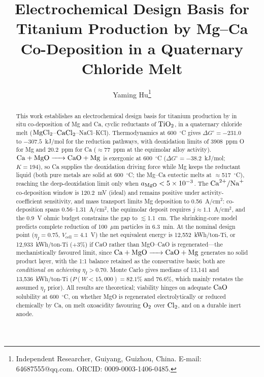 \documentclass[11pt]{article}
\begin{document}
\linenumbers
\doublespacing

\title{Electrochemical Design Basis for Titanium Production by Mg--Ca Co-Deposition in a Quaternary Chloride Melt}

\author{Yaming Hu\thanks{Independent Researcher, Guiyang, Guizhou, China. E-mail: 64687555@qq.com. ORCID: 0009-0003-1406-0485.}}

\date{}

\maketitle

\begin{abstract}
This work establishes an electrochemical design basis for titanium production by in situ co-deposition of Mg and Ca, cyclic reductants of $\ce{TiO2}$, in a quaternary chloride melt ($\ce{MgCl2}$--$\ce{CaCl2}$--NaCl--KCl). Thermodynamics at 600~$^{\circ}$C gives $\Delta G^{\circ} = -231.0$ to $-307.5$~kJ/mol for the reduction pathways, with deoxidation limits of 3908~ppm O for Mg and 20.2~ppm for Ca ($\approx$77~ppm at the equimolar alloy activity). $\ce{Ca + MgO -> CaO + Mg}$ is exergonic at 600~$^{\circ}$C ($\Delta G^{\circ} = -38.2$~kJ/mol; $K = 194$), so Ca supplies the deoxidation driving force while Mg keeps the reductant liquid (both pure metals are solid at 600~$^{\circ}$C; the Mg--Ca eutectic melts at $\approx$517~$^{\circ}$C), reaching the deep-deoxidation limit only when $a_{\ce{MgO}} < 5\times10^{-3}$. The $\ce{Ca^{2+}/Na+}$ co-deposition window is 120.2~mV (ideal) and remains positive under activity-coefficient sensitivity, and mass transport limits Mg deposition to 0.56~A/cm$^2$: co-deposition spans 0.56--1.31~A/cm$^2$, the equimolar deposit requires $j \approx 1.1$~A/cm$^2$, and the 0.9~V ohmic budget constrains the gap to $\lesssim$1.1~cm. The shrinking-core model predicts complete reduction of 100~$\mu$m particles in 6.3~min. At the nominal design point ($\eta_I = 0.75$, $V_{\mathrm{cell}} = 4.1$~V) the net equivalent energy is 12{,}552~kWh/ton-Ti, or 12{,}933~kWh/ton-Ti ($+$3\%) if CaO rather than MgO--CaO is regenerated---the mechanistically favoured limit, since $\ce{Ca + MgO -> CaO + Mg}$ generates no solid product layer, with the 1:1 balance retained as the conservative basis; both are \emph{conditional on achieving $\eta_I > 0.70$}. Monte Carlo gives medians of 13{,}141 and 13{,}536~kWh/ton-Ti ($P(W<15{,}000) = 82.1\%$ and 76.6\%, which mainly restates the assumed $\eta_I$ prior). All results are theoretical; viability hinges on adequate $\ce{CaO}$ solubility at 600~$^{\circ}$C, on whether MgO is regenerated electrolytically or reduced chemically by Ca, on melt oxoacidity favouring $\ce{O2}$ over $\ce{Cl2}$, and on a durable inert anode.
\end{abstract}
\end{document}
